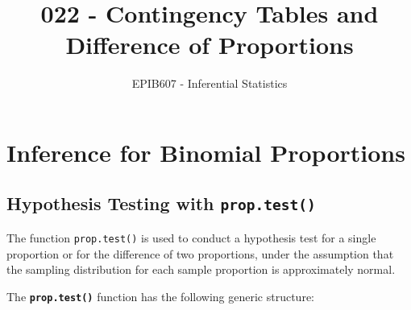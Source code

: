 \documentclass[letterpaper,12pt,twoside,]{pinp}
\title{022 - Contingency Tables and Difference of Proportions}
\author[a]{EPIB607 - Inferential Statistics}
\affil[a]{Fall 2020, McGill University}
\begin{document}
\verticaladjustment{-2pt}

\maketitle
\thispagestyle{firststyle}



\hypertarget{inference-for-binomial-proportions}{%
\section{Inference for Binomial
Proportions}\label{inference-for-binomial-proportions}}

\hypertarget{hypothesis-testing-with}{%
\subsection{\texorpdfstring{Hypothesis Testing with
\texttt{prop.test()}}{Hypothesis Testing with }}\label{hypothesis-testing-with}}

The function \texttt{prop.test()} is used to conduct a hypothesis test
for a single proportion or for the difference of two proportions, under
the assumption that the sampling distribution for each sample proportion
is approximately normal.

The \textbf{\texttt{prop.test()}} function has the following generic
structure:

\begin{Shaded}
\begin{Highlighting}[]
 \NormalTok{, } \NormalTok{, } \NormalTok{, } \NormalTok{)}
\end{Highlighting}
\end{Shaded}
\end{document}

